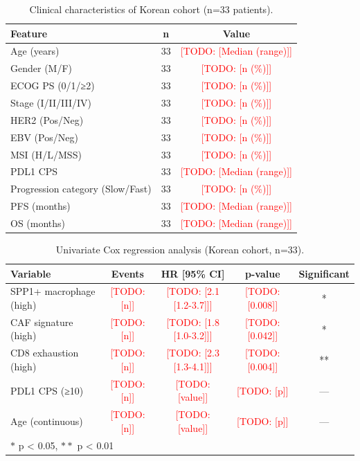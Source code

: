 \documentclass[12pt,oneside]{article}
\newcommand{\TODO}[1]{\textcolor{red}{[TODO: #1]}}
\begin{document}
\begin{table}[H]
\centering
\caption{Clinical characteristics of Korean cohort (n=33 patients).}
\label{tab:clinical}
\small
\begin{tabular}{l c c}
\toprule
\textbf{Feature} & \textbf{n} & \textbf{Value} \\
\midrule
Age (years) & 33 & \TODO{[Median (range)]} \\
Gender (M/F) & 33 & \TODO{[n (\%)]} \\
ECOG PS (0/1/≥2) & 33 & \TODO{[n (\%)]} \\
Stage (I/II/III/IV) & 33 & \TODO{[n (\%)]} \\
HER2 (Pos/Neg) & 33 & \TODO{[n (\%)]} \\
EBV (Pos/Neg) & 33 & \TODO{[n (\%)]} \\
MSI (H/L/MSS) & 33 & \TODO{[n (\%)]} \\
PDL1 CPS & 33 & \TODO{[Median (range)]} \\
Progression category (Slow/Fast) & 33 & \TODO{[n (\%)]} \\
PFS (months) & 33 & \TODO{[Median (range)]} \\
OS (months) & 33 & \TODO{[Median (range)]} \\
\bottomrule
\end{tabular}
\end{table}

\begin{table}[H]
\centering
\caption{Univariate Cox regression analysis (Korean cohort, n=33).}
\label{tab:univariate_cox}
\small
\begin{tabular}{l c c c c}
\toprule
\textbf{Variable} & \textbf{Events} & \textbf{HR [95\% CI]} & \textbf{p-value} & \textbf{Significant} \\
\midrule
SPP1+ macrophage (high) & \TODO{[n]} & \TODO{[2.1 [1.2-3.7]]} & \TODO{[0.008]} & * \\
CAF signature (high) & \TODO{[n]} & \TODO{[1.8 [1.0-3.2]]} & \TODO{[0.042]} & * \\
CD8 exhaustion (high) & \TODO{[n]} & \TODO{[2.3 [1.3-4.1]]} & \TODO{[0.004]} & ** \\
PDL1 CPS (≥10) & \TODO{[n]} & \TODO{[value]} & \TODO{[p]} & — \\
Age (continuous) & \TODO{[n]} & \TODO{[value]} & \TODO{[p]} & — \\
\bottomrule
\multicolumn{5}{l}{$*$ p < 0.05, $**$ p < 0.01} \\
\end{tabular}
\end{table}
\end{document}
